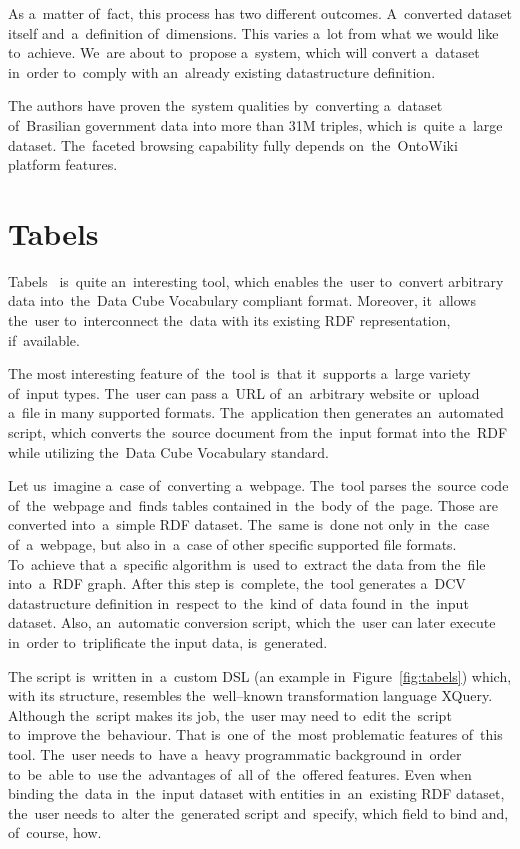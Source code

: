 As a~matter of~fact, this process has two different outcomes. A~converted 
dataset itself and~a~definition of~dimensions. This varies a~lot from what 
we would like to~achieve. We~are about to~propose a~system, which will convert a~dataset in~order to~comply with an~already existing datastructure definition.

The authors have proven the~system qualities by~converting a~dataset of~Brasilian government data
into more than 31M triples, which is~quite a~large dataset. The~faceted browsing
capability fully depends on~the~OntoWiki platform features.

\section{Tabels}
\label{rw:tabels}
Tabels~\cite{tabels-web} is~quite an~interesting tool, which enables the~user to~convert arbitrary data into~the~Data Cube Vocabulary compliant format. 
Moreover, it~allows the~user to~interconnect the~data with its existing RDF 
representation, if~available.

The most interesting feature of~the~tool is~that it~supports a~large variety of~input types. The~user can pass a~URL of~an~arbitrary website or~upload a~file 
in many supported formats. The~application then generates an~automated script, which converts the~source document from the~input format 
into the~RDF while utilizing the~Data Cube Vocabulary standard.

Let us~imagine a~case of~converting a~webpage. The~tool parses the~source code of~the~webpage and~finds tables contained in~the~body of~the~page. Those are converted into~a~simple
RDF dataset. The~same is~done not only in~the~case of~a~webpage, but also in~a~case
of other specific supported file formats. To~achieve that a~specific algorithm is~used to~extract
the data from the~file into~a~RDF graph. After this step is~complete, the~tool generates a~DCV
datastructure definition in~respect to~the~kind of~data found in~the~input dataset.
Also, an~automatic conversion script, which the~user can later execute in~order to~triplificate
the input data, is~generated.

The script is~written in~a~custom DSL (an example in~Figure~\ref{fig:tabels}) which,
with its structure, resembles the~well--known
transformation language XQuery. Although the~script makes its job, the~user may need to~edit the~script to~improve the~behaviour. That is~one of~the~most problematic features of~this tool. The~user needs to~have a~heavy programmatic 
background in~order to~be~able to~use the~advantages of~all of~the~offered features. 
Even when binding the~data in~the~input dataset with entities in~an~existing RDF 
dataset, the~user needs to~alter the~generated script and~specify, which field 
to bind and, of~course, how.


